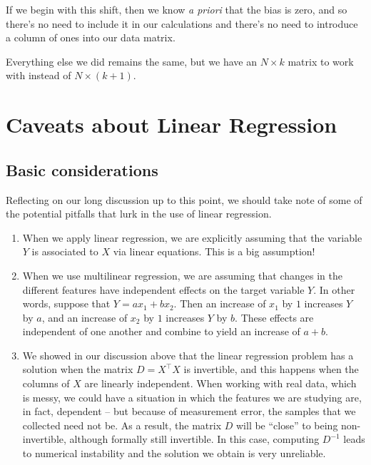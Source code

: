 \documentclass[
  11pt,
  letterpaper,
]{scrbook}
\theoremstyle{plain}
\theoremstyle{remark}
\begin{document}
If we begin with this shift, then we know \emph{a priori} that the bias
is zero, and so there's no need to include it in our calculations and
there's no need to introduce a column of ones into our data matrix.

Everything else we did remains the same, but we have an \(N\times k\)
matrix to work with instead of \(N\times (k+1)\).

\hypertarget{caveats-about-linear-regression}{%
\section{Caveats about Linear
Regression}\label{caveats-about-linear-regression}}

\hypertarget{basic-considerations}{%
\subsection{Basic considerations}\label{basic-considerations}}

Reflecting on our long discussion up to this point, we should take note
of some of the potential pitfalls that lurk in the use of linear
regression.

\begin{enumerate}
\def\labelenumi{\arabic{enumi}.}
\item
  When we apply linear regression, we are explicitly assuming that the
  variable \(Y\) is associated to \(X\) via linear equations. This is a
  big assumption!
\item
  When we use multilinear regression, we are assuming that changes in
  the different features have independent effects on the target variable
  \(Y\). In other words, suppose that \(Y=ax_1+bx_2\). Then an increase
  of \(x_1\) by \(1\) increases \(Y\) by \(a\), and an increase of
  \(x_2\) by \(1\) increases \(Y\) by \(b\). These effects are
  independent of one another and combine to yield an increase of
  \(a+b\).
\item
  We showed in our discussion above that the linear regression problem
  has a solution when the matrix \(D=X^{\intercal}X\) is invertible, and
  this happens when the columns of \(X\) are linearly independent. When
  working with real data, which is messy, we could have a situation in
  which the features we are studying are, in fact, dependent -- but
  because of measurement error, the samples that we collected need not
  be. As a result, the matrix \(D\) will be ``close'' to being
  non-invertible, although formally still invertible. In this case,
  computing \(D^{-1}\) leads to numerical instability and the solution
  we obtain is very unreliable.
\end{enumerate}
\end{document}
